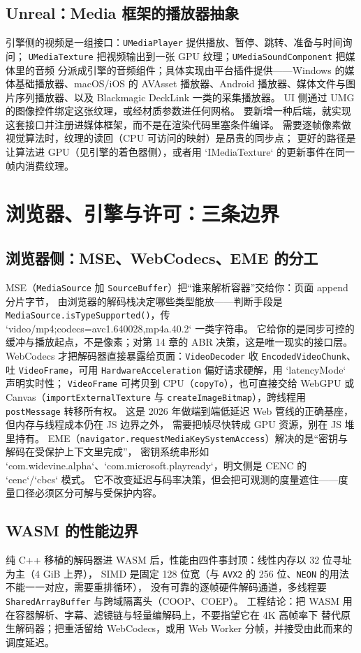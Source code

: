 \documentclass[12pt,a4paper,fontset=fandol]{ctexbook}
\newcommand{\Fn}[1]{\texttt{#1()}}
\newcommand{\Tp}[1]{\texttt{#1}}
\newcommand{\Bk}{\discretionary{}{}{}}
\newcommand{\Lang}[1]{\textsf{#1}}
\newcommand{\CPP}{\Lang{C++}}
\begin{document}
\subsection*{Unreal：Media 框架的播放器抽象}
引擎侧的视频是一组接口：\Tp{UMediaPl{\Bk}ayer} 提供播放、暂停、跳转、准备与时间询问；
\Tp{UMediaTe{\Bk}xture} 把视频输出到一张 GPU 纹理；\Tp{UMediaSo{\Bk}undCompo{\Bk}nent} 把媒体里的音频
分派成引擎的音频组件；具体实现由平台插件提供——Windows 的媒体基础播放器、macOS/iOS 的
AVAsset 播放器、Android 播放器、媒体文件与图片序列播放器、以及 Blackmagic DeckLink 一类的采集播放器。
UI 侧通过 UMG 的图像控件绑定这张纹理，或经材质参数进任何网格。
要新增一种后端，就实现这套接口并注册进媒体框架，而不是在渲染代码里塞条件编译。
需要逐帧像素做视觉算法时，纹理的读回（CPU 可访问的映射）是昂贵的同步点；
更好的路径是让算法进 GPU（见引擎的着色器侧），或者用 `IMediaTexture` 的更新事件在同一帧内消费纹理。

\section{浏览器、引擎与许可：三条边界}

\subsection*{浏览器侧：MSE、WebCodecs、EME 的分工}
MSE（\Tp{MediaSou{\Bk}rce} 加 \Tp{SourceBu{\Bk}ffer}）把``谁来解析容器''交给你：页面 append 分片字节，
由浏览器的解码栈决定哪些类型能放——判断手段是 \Fn{MediaSou{\Bk}rce.{\Bk}isType{\Bk}Supporte{\Bk}d}，传
`video/mp4;codecs=avc1.640028,mp4a.40.2` 一类字符串。
它给你的是同步可控的缓冲与播放起点，不是像素；对第 14 章的 ABR 决策，这是唯一现实的接口层。
WebCodecs 才把解码器直接暴露给页面：\Tp{VideoDec{\Bk}oder} 收 \Tp{EncodedV{\Bk}ideoChunk}、吐
\Tp{VideoFra{\Bk}me}，可用 \Tp{Hardware{\Bk}Accelera{\Bk}tion} 偏好请求硬解，用 `latencyMode` 声明实时性；
\Tp{VideoFra{\Bk}me} 可拷贝到 CPU（\Tp{copyTo}），也可直接交给 WebGPU 或 Canvas（\Tp{importExternalTexture} 与 \Tp{createImageBitmap}），跨线程用 \Tp{postMessage} 转移所有权。
这是 2026 年做端到端低延迟 Web 管线的正确基座，但内存与线程成本仍在 JS 边界之外，
需要把帧尽快转成 GPU 资源，别在 JS 堆里持有。
EME（\Tp{navigator.{\Bk}reques{\Bk}tMediaKe{\Bk}ySystemA{\Bk}ccess}）解决的是``密钥与解码在受保护上下文里完成''，
密钥系统串形如 `com.widevine.alpha`、`com.microsoft.playready`，明文侧是 CENC 的 `cenc`/`cbcs` 模式。
它不改变延迟与码率决策，但会把可观测的度量遮住——度量口径必须区分可解与受保护内容。

\subsection*{WASM 的性能边界}
纯 \CPP{} 移植的解码器进 WASM 后，性能由四件事封顶：线性内存以 32 位寻址为主（4 GiB 上界），
SIMD 是固定 128 位宽（与 \Tp{AVX2} 的 256 位、\Tp{NEON} 的用法不能一一对应，需要重排循环），
没有可靠的逐帧硬件解码通道，多线程要 \Tp{SharedAr{\Bk}rayBuffe{\Bk}r} 与跨域隔离头（COOP、COEP）。
工程结论：把 WASM 用在容器解析、字幕、滤镜链与轻量编解码上，不要指望它在 4K 高帧率下
替代原生解码器；把重活留给 WebCodecs，或用 Web Worker 分帧，并接受由此而来的调度延迟。
\end{document}
